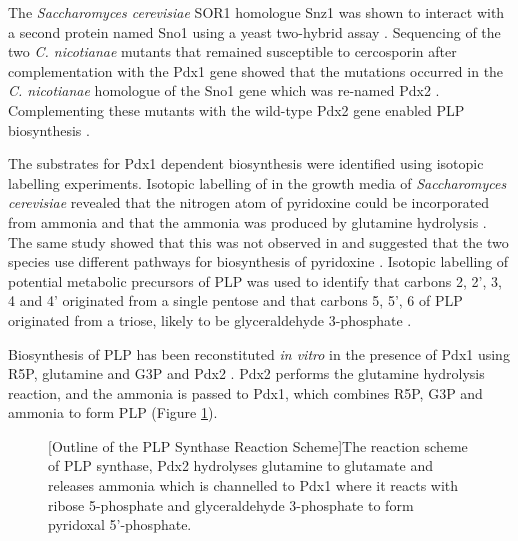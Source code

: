 The \textit{Saccharomyces cerevisiae} SOR1 homologue Snz1 was shown to interact with a second protein named Sno1 using a yeast two-hybrid assay \cite{Padilla1998}. Sequencing of the two \textit{C. nicotianae} mutants that remained susceptible to cercosporin after complementation with the Pdx1 gene showed that the mutations occurred in the \textit{C. nicotianae} homologue of the Sno1 gene which was re-named Pdx2 \cite{Ehrenshaft2001}. Complementing these mutants with the wild-type Pdx2 gene enabled PLP biosynthesis \cite{Ehrenshaft2001}. \par

The substrates for Pdx1 dependent biosynthesis were identified using isotopic labelling experiments. Isotopic labelling of   in the growth media of \textit{Saccharomyces cerevisiae} revealed that the nitrogen atom of pyridoxine could be incorporated from ammonia and that the ammonia was produced by glutamine hydrolysis \cite{Tazuya1995}. The same study showed that this was not observed in \ecoli and suggested that the two species use different pathways for biosynthesis of pyridoxine \cite{Tazuya1995}. Isotopic labelling of potential metabolic precursors of PLP was used to identify that carbons 2, 2', 3, 4 and 4' originated from a single pentose and that carbons 5, 5', 6 of PLP originated from a triose, likely to be glyceraldehyde 3-phosphate \cite{Zeidler2003,Gupta2001}.   

Biosynthesis of PLP has been reconstituted \textit{in vitro} in the presence of Pdx1 using R5P, glutamine and G3P and Pdx2 \cite{Burns2005,Hanes2008a}. Pdx2 performs the glutamine hydrolysis reaction, and the ammonia is passed to Pdx1, which combines R5P, G3P and ammonia to form PLP (Figure \ref{fig:reaction_scheme}). 
\par 

\begin{figure}[!htbp]
\begin{minipage}{\linewidth}

	[Outline of the PLP Synthase Reaction Scheme]{The reaction scheme of PLP synthase, Pdx2 hydrolyses glutamine to glutamate and releases ammonia which is channelled to Pdx1 where it reacts with ribose 5-phosphate and glyceraldehyde 3-phosphate to form pyridoxal 5'-phosphate.\label{fig:reaction_scheme}}	
\end{minipage}
\end{figure}


